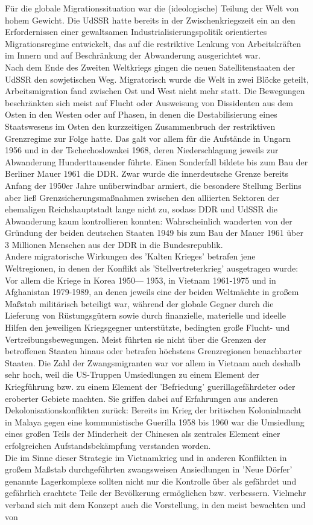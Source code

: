 \documentclass[letterpaper, 12pt]{article}
\begin{document}
Für die globale Migrationssituation war die (ideologische) Teilung der Welt von hohem Gewicht. Die UdSSR hatte bereits in der Zwischenkriegszeit ein an den Erfordernissen einer gewaltsamen Industrialisierungspolitik orientiertes Migrationsregime entwickelt, das auf die restriktive Lenkung von Arbeitskräften im Innern und auf Beschränkung der Abwanderung ausgerichtet war. \\ Nach dem Ende des Zweiten Weltkriegs gingen die neuen Satellitenstaaten der UdSSR den sowjetischen Weg. Migratorisch wurde die Welt in zwei Blöcke geteilt, Arbeitsmigration fand zwischen Ost und West nicht mehr statt. Die Bewegungen beschränkten sich meist auf Flucht oder Ausweisung von Dissidenten aus dem Osten in den Westen oder auf Phasen, in denen die Destabilisierung eines Staatswesens im Osten den kurzzeitigen Zusammenbruch der restriktiven Grenzregime zur Folge hatte. Das galt vor allem für die Aufstände in Ungarn 1956 und in der Tschechoslowakei 1968, deren Niederschlagung jeweils zur Abwanderung Hunderttausender führte. Einen Sonderfall bildete bis zum Bau der Berliner Mauer 1961 die DDR. Zwar wurde die innerdeutsche Grenze bereits Anfang der 1950er Jahre unüberwindbar armiert, die besondere Stellung Berlins aber ließ Grenzsicherungsmaßnahmen zwischen den alliierten Sektoren der ehemaligen Reichshauptstadt lange nicht zu, sodass DDR und UdSSR die Abwanderung kaum kontrollieren konnten: Wahrscheinlich wanderten von der Gründung der beiden deutschen Staaten 1949 bis zum Bau der Mauer 1961 über 3 Millionen Menschen aus der DDR in die Bundesrepublik. \\ Andere migratorische Wirkungen des 'Kalten Krieges' betrafen jene Weltregionen, in denen der Konflikt als 'Stellvertreterkrieg' ausgetragen wurde: Vor allem die Kriege in Korea 1950— 1953, in Vietnam 1961-1975 und in Afghanistan 1979-1989, an denen jeweils eine der beiden Weltmächte in großem Maßstab militärisch beteiligt war, während der globale Gegner durch die Lieferung von Rüstungsgütern sowie durch finanzielle, materielle und ideelle Hilfen den jeweiligen Kriegsgegner unterstützte, bedingten große Flucht- und Vertreibungsbewegungen. Meist führten sie nicht über die Grenzen der betroffenen Staaten hinaus oder betrafen höchstens Grenzregionen benachbarter Staaten. \clearpage Die Zahl der Zwangsmigranten war vor allem in Vietnam auch deshalb sehr hoch, weil die US-Truppen Umsiedlungen zu einem Element der Kriegführung bzw. zu einem Element der 'Befriedung' guerillagefährdeter oder eroberter Gebiete machten. Sie griffen dabei auf Erfahrungen aus anderen Dekolonisationskonflikten zurück: Bereits im Krieg der britischen Kolonialmacht in Malaya gegen eine kommunistische Guerilla 1958 bis 1960 war die Umsiedlung eines großen Teils der Minderheit der Chinesen als zentrales Element einer erfolgreichen Aufstandsbekämpfung verstanden worden. \\ Die im Sinne dieser Strategie im Vietnamkrieg und in anderen Konflikten in großem Maßstab durchgeführten zwangsweisen Ansiedlungen in 'Neue Dörfer' genannte Lagerkomplexe sollten nicht nur die Kontrolle über als gefährdet und gefährlich erachtete Teile der Bevölkerung ermöglichen bzw. verbessern. Vielmehr verband sich mit dem Konzept auch die Vorstellung, in den meist bewachten und von 
\end{document}
